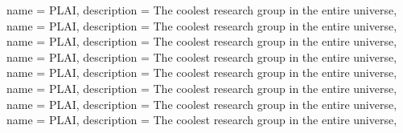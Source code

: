 {
  name = PLAI,
  description = {The coolest research group in the entire universe},
}
{
  name = PLAI,
  description = {The coolest research group in the entire universe},
}
{
  name = PLAI,
  description = {The coolest research group in the entire universe},
}
{
  name = PLAI,
  description = {The coolest research group in the entire universe},
}
{
  name = PLAI,
  description = {The coolest research group in the entire universe},
}
{
  name = PLAI,
  description = {The coolest research group in the entire universe},
}
{
  name = PLAI,
  description = {The coolest research group in the entire universe},
}
{
  name = PLAI,
  description = {The coolest research group in the entire universe},
}